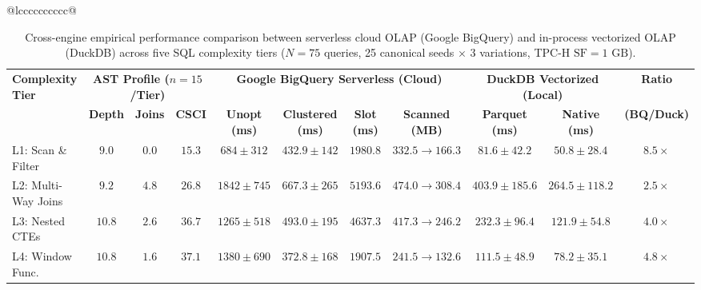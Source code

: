 \documentclass[10pt,a4paper]{article}
\begin{document}
\begin{table}[!t]
\begin{tabular}{@{}lcccccccccc@{}}
\bottomrule
{}\\
\end{tabular}
\end{table}

\begin{table}[!t]
\centering
\caption{Cross-engine empirical performance comparison between serverless cloud OLAP (Google BigQuery) and in-process vectorized OLAP (DuckDB) across five SQL complexity tiers ($N=75$ queries, 25 canonical seeds $\times$ 3 variations, TPC-H $\text{SF}=1\text{ GB}$).}
\label{tab:cross_engine_main}
\scriptsize
\setlength{\tabcolsep}{3.8pt}
\renewcommand{\arraystretch}{1.12}
\begin{tabular}{@{}lcccccccccc@{}}
\toprule
\multirow{2}{*}{\textbf{Complexity Tier}} & \multicolumn{3}{c}{\textbf{AST Profile ($n=15$/Tier)}} & \multicolumn{4}{c}{\textbf{Google BigQuery Serverless (Cloud)}} & \multicolumn{2}{c}{\textbf{DuckDB Vectorized (Local)}} & \textbf{Ratio} \\
\cmidrule(lr){2-4} \cmidrule(lr){5-8} \cmidrule(lr){9-10} \cmidrule(lr){11-11}
 & \textbf{Depth} & \textbf{Joins} & \textbf{CSCI} & \textbf{Unopt (ms)} & \textbf{Clustered (ms)} & \textbf{Slot (ms)} & \textbf{Scanned (MB)} & \textbf{Parquet (ms)} & \textbf{Native (ms)} & \textbf{(BQ/Duck)} \\
\midrule
L1: Scan \& Filter & $9.0$ & $0.0$ & $15.3$ & $684 \pm 312$ & $432.9 \pm 142$ & $1980.8$ & $332.5 \rightarrow 166.3$ & $81.6 \pm 42.2$ & $\mathbf{50.8 \pm 28.4}$ & $8.5\times$ \\
L2: Multi-Way Joins & $9.2$ & $4.8$ & $26.8$ & $1842 \pm 745$ & $667.3 \pm 265$ & $5193.6$ & $474.0 \rightarrow 308.4$ & $403.9 \pm 185.6$ & $\mathbf{264.5 \pm 118.2}$ & $2.5\times$ \\
L3: Nested CTEs & $10.8$ & $2.6$ & $36.7$ & $1265 \pm 518$ & $493.0 \pm 195$ & $4637.3$ & $417.3 \rightarrow 246.2$ & $232.3 \pm 96.4$ & $\mathbf{121.9 \pm 54.8}$ & $4.0\times$ \\
L4: Window Func. & $10.8$ & $1.6$ & $37.1$ & $1380 \pm 690$ & $372.8 \pm 168$ & $1907.5$ & $241.5 \rightarrow 132.6$ & $111.5 \pm 48.9$ & $\mathbf{78.2 \pm 35.1}$ & $4.8\times$ \\

\end{tabular}
\end{table}
\end{document}
